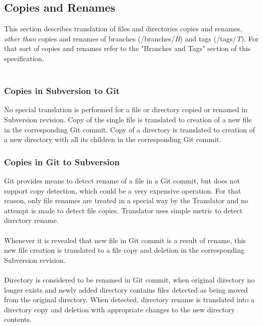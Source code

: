\subsection{Copies and Renames}
This section describes translation of files and directories copies and renames, \emph{other than} copies and renames of 
branches (/branches/\emph{B}) and tags (/tags/\emph{T}). For that sort of copies and renames refer to the "Branches and Tags" 
section of this specification.\\\\

\subsubsection{Copies in Subversion to Git}
No special translation is performed for a file or directory copied or renamed in Subversion revision. Copy of the single file is translated 
to creation of a new file in the corresponding Git commit. Copy of a directory is translated to creation of a new directory with all its children
in the corresponding Git commit.

\subsubsection{Copies in Git to Subversion}
Git provides means to detect rename of a file in a Git commit, but does not support copy detection, which could be 
a very expensive operation. For that reason, only file renames are treated in a special way by the Translator and
no attempt is made to detect file copies. Translator uses simple metric to detect directory rename.\\\\
Whenever it is revealed that new file in Git commit is a result of rename, this new file creation is translated to a file copy and deletion in the 
corresponding Subversion revision.\\\\ 
Directory is considered to be renamed in Git commit, when original directory no longer exists and newly added directory contains
files detected as being moved from the original directory. When detected, directory rename is translated into a directory copy
and deletion with appropriate changes to the new directory contents.
